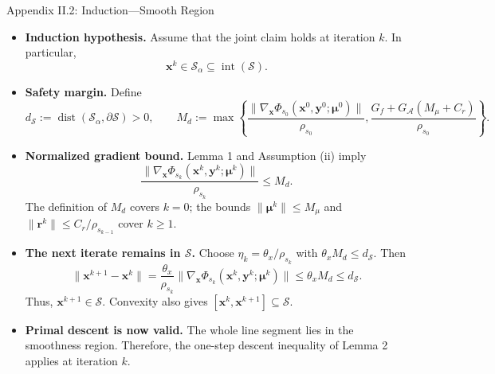 \documentclass[handout,compress,9pt]{beamer}
\newcommand{\blue}[1]{\textcolor{ddlblue}{#1}}
\newcommand{\bx}{\bm{x}}
\newcommand{\by}{\bm{y}}
\newcommand{\br}{\bm{r}}
\newcommand{\bmu}{\bm{\mu}}
\newcommand{\calA}{\mathcal{A}}
\newcommand{\calS}{\mathcal{S}}
\begin{document}
\begin{frame}{Appendix II.2: Induction---Smooth Region
\hfill\hyperlink{appendix:contents}{}}
\scriptsize
\begin{itemize}
\setlength{\itemsep}{0.13cm}

\item[\blue{$\triangleright$}]
\textbf{Induction hypothesis.}
Assume that the joint claim holds at iteration $k$. In particular,
\begin{equation*}
  \bx^k\in\calS_\alpha\subseteq\operatorname{int}(\calS).
\end{equation*}

\item[\blue{$\triangleright$}]
\textbf{Safety margin.}
Define
\begin{equation*}
  d_{\calS}:=\operatorname{dist}(\calS_\alpha,\partial\calS)>0,
  \qquad
  M_d:=\max\left\{
  \frac{\|\nabla_{\bx}\Phi_{s_0}(\bx^0,\by^0;\bmu^0)\|}{\rho_{s_0}},
  \frac{G_f+G_{\calA}(M_\mu+C_r)}{\rho_{s_0}}
  \right\}.
\end{equation*}

\item[\blue{$\triangleright$}]
\textbf{Normalized gradient bound.}
Lemma 1 and Assumption (ii) imply
\begin{equation*}
  \frac{\|\nabla_{\bx}\Phi_{s_k}(\bx^k,\by^k;\bmu^k)\|}
       {\rho_{s_k}}
  \leq M_d.
\end{equation*}
The definition of $M_d$ covers $k=0$; the bounds
$\|\bmu^k\|\leq M_\mu$ and $\|\br^k\|\leq C_r/\rho_{s_{k-1}}$
cover $k\geq1$.

\item[\blue{$\triangleright$}]
\textbf{The next iterate remains in $\calS$.}
Choose $\eta_k=\theta_x/\rho_{s_k}$ with
$\theta_xM_d\leq d_{\calS}$. Then
\begin{equation*}
  \|\bx^{k+1}-\bx^k\|
  =\frac{\theta_x}{\rho_{s_k}}
  \|\nabla_{\bx}\Phi_{s_k}(\bx^k,\by^k;\bmu^k)\|
  \leq\theta_xM_d
  \leq d_{\calS}.
\end{equation*}
Thus, $\bx^{k+1}\in\calS$. Convexity also gives
$[\bx^k,\bx^{k+1}]\subseteq\calS$.

\item[\blue{$\triangleright$}]
\textbf{Primal descent is now valid.}
The whole line segment lies in the smoothness region. Therefore, the
one-step descent inequality of Lemma 2 applies at iteration $k$.
\end{itemize}
\end{frame}
\end{document}
